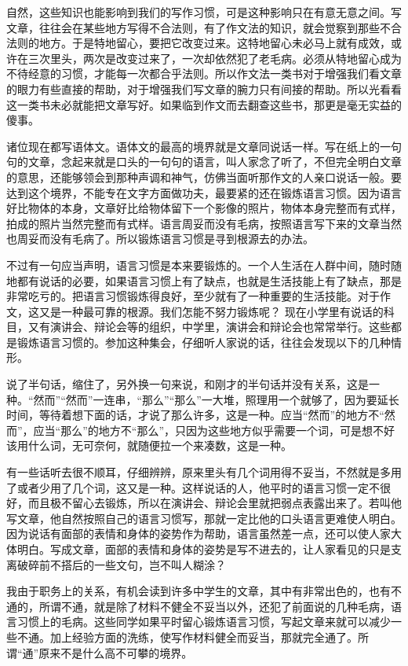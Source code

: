 \documentclass[12pt,a5paper]{ctexbook}
\begin{document}
自然，这些知识也能影响到我们的写作习惯，可是这种影响只在有意无意之间。写文章，往往会在某些地方写得不合法则，有了作文法的知识，就会觉察到那些不合法则的地方。于是特地留心，要把它改变过来。这特地留心未必马上就有成效，或许在三次里头，两次是改变过来了，一次却依然犯了老毛病。必须从特地留心成为不待经意的习惯，才能每一次都合乎法则。所以作文法一类书对于增强我们看文章的眼力有些直接的帮助，对于增强我们写文章的腕力只有间接的帮助。所以光看看这一类书未必就能把文章写好。如果临到作文而去翻查这些书，那更是毫无实益的傻事。

诸位现在都写语体文。语体文的最高的境界就是文章同说话一样。写在纸上的一句句的文章，念起来就是口头的一句句的语言，叫人家念了听了，不但完全明白文章的意思，还能够领会到那种声调和神气，仿佛当面听那作文的人亲口说话一般。要达到这个境界，不能专在文字方面做功夫，最要紧的还在锻炼语言习惯。因为语言好比物体的本身，文章好比给物体留下一个影像的照片，物体本身完整而有式样，拍成的照片当然完整而有式样。语言周妥而没有毛病，按照语言写下来的文章当然也周妥而没有毛病了。所以锻炼语言习惯是寻到根源去的办法。

不过有一句应当声明，语言习惯是本来要锻炼的。一个人生活在人群中间，随时随地都有说话的必要，如果语言习惯上有了缺点，也就是生活技能上有了缺点，那是非常吃亏的。把语言习惯锻炼得良好，至少就有了一种重要的生活技能。对于作文，这又是一种最可靠的根源。我们怎能不努力锻炼呢？
现在小学里有说话的科目，又有演讲会、辩论会等的组织，中学里，演讲会和辩论会也常常举行。这些都是锻炼语言习惯的。参加这种集会，仔细听人家说的话，往往会发现以下的几种情形。

说了半句话，缩住了，另外换一句来说，和刚才的半句话并没有关系，这是一种。“然而”“然而”一连串，“那么”“那么”一大堆，照理用一个就够了，因为要延长时间，等待着想下面的话，才说了那么许多，这是一种。应当“然而”的地方不“然而”，应当“那么”的地方不“那么”，只因为这些地方似乎需要一个词，可是想不好该用什么词，无可奈何，就随便拉一个来凑数，这是一种。

有一些话听去很不顺耳，仔细辨辨，原来里头有几个词用得不妥当，不然就是多用了或者少用了几个词，这又是一种。这样说话的人，他平时的语言习惯一定不很好，而且极不留心去锻炼，所以在演讲会、辩论会里就把弱点表露出来了。若叫他写文章，他自然按照自己的语言习惯写，那就一定比他的口头语言更难使人明白。因为说话有面部的表情和身体的姿势作为帮助，语言虽然差一点，还可以使人家大体明白。写成文章，面部的表情和身体的姿势是写不进去的，让人家看见的只是支离破碎前不搭后的一些文句，岂不叫人糊涂？

我由于职务上的关系，有机会读到许多中学生的文章，其中有非常出色的，也有不通的，所谓不通，就是除了材料不健全不妥当以外，还犯了前面说的几种毛病，语言习惯上的毛病。这些同学如果平时留心锻炼语言习惯，写起文章来就可以减少一些不通。加上经验方面的洗练，使写作材料健全而妥当，那就完全通了。所谓“通”原来不是什么高不可攀的境界。
\end{document}
